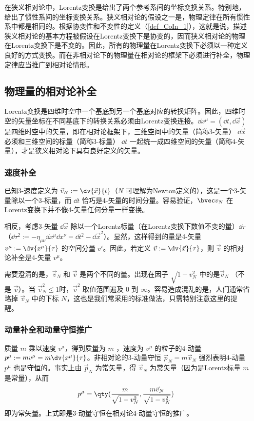 
\cite{AZee}在狭义相对论中，Lorentz变换是给出了两个参考系间的坐标变换关系。特别地，给出了惯性系间的坐标变换关系。狭义相对论的假设之一是，物理定律在所有惯性系中都是相同的。根据协变性和不变性的定义（\autoref{def_CoIn_1}），这就是说，描述狭义相对论的基本方程被假设在Lorentz变换下是协变的，因而狭义相对论的物理在Lorentz变换下是不变的。因此，所有的物理量在Lorentz变换下必须以一种定义良好的方式变换。而在非相对论下的物理量在相对论的框架下必须进行补全，物理定律应当推广到相对论情形。
\subsection{物理量的相对论补全}
Lorentz变换是四维时空中一个基底到另一个基底对应的转换矩阵。因此，四维时空的矢量坐标在不同基底下的转换关系必须由Lorentz变换连接。$\dd x^\mu=(\dd t,\dd{\vec x})$ 是四维时空中的矢量，即在相对论框架下，三维空间中的矢量（简称3-矢量） $\dd{\vec x}$ 必须和三维空间的标量（简称3-标量） $\dd t$ 一起统一成四维空间的矢量（简称4-矢量），才是狭义相对论下具有良好定义的矢量。

\subsubsection{速度补全}
已知3-速度定义为 $\vec v_N:=\dv{\vec x}{t}$（$N$ 可理解为Newton定义的），这是一个3-矢量除以一个3-标量，而 $\dd t$ 恰巧是4-矢量的时间分量。容易验证，$\bvec v_N$ 在Lorentz变换下并不像4-矢量任何分量一样变换。

相反，考虑3-矢量 $\dd{\vec x}$ 除以一个Lorentz标量（在Lorentz变换下数值不变的量）$\dd\tau$ （$\dd \tau^2:=-\eta_{\mu\nu}\dd x^{\mu}\dd x^\nu=\dd t^2-\dd {\vec x^2}$）。显然，这样得到的量是4-矢量 $v^\mu:=\dv{x^\mu}{\tau}$ 的空间分量 $v^i$。因此，若定义 $\vec v:=\dv{\vec x}{\tau}$，则 $\vec v$ 的相对论补全是4-矢量 $v^\mu$。

需要澄清的是，$\vec v_N$ 和 $\vec v$ 是两个不同的量。出现在因子 $\sqrt{1-v_N^2}$ 中的是$\vec v_N$ （不是 $\vec v$）。当 $\vec v_N^2\leq1$时，$\vec v^2$ 取值范围遍及 $0$ 到 $\infty$。容易造成混乱的是，人们通常省略掉 $\vec v_N$ 中的下标 $N$，这也是我们常采用的标准做法，只需特别注意这里的提醒。

\subsubsection{动量补全和动量守恒推广}
质量 $m$ 乘以速度 $v^\mu$，得到质量为 $m$ ，速度为 $v^\mu$ 的粒子的4-动量 $p^\mu:=mv^\mu=m\dv{x^\mu}{\tau}$。非相对论的3-动量守恒 $\vec p_N=m\vec v_N$ 强烈表明4-动量 $p^\mu$ 也是守恒的。事实上由 $\vec p_N$ 为常矢量，得 $\vec v_N$ 为常矢量（因为是Lorentz标量 $m$ 是常量），从而 
\begin{equation}
p^\mu=\qty(\frac{m}{\sqrt{1-v_N^2}},\frac{m\vec v_N}{\sqrt{1-v_N^2}})~
\end{equation}
即为常矢量。上式即是3-动量守恒在相对论4-动量守恒的推广。

